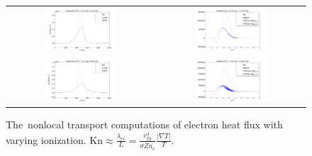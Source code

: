 \documentclass[preprint,12pt]{elsarticle}
\newcommand{\mfpei}{\lambda_{ei}}
\newcommand{\Zbar}{\bar{Z}}
\newcommand{\vth}{v_{th}}
\newcounter{bla}
\begin{document}
\begin{figure}[tbh]
\begin{center}
\begin{tabular}{cc}
      \includegraphics[width=0.5\textwidth]{../results/fe_analysis/figs/P5_heatfluxes_niZ2_Kn13e-3.png} &
      \includegraphics[width=0.5\textwidth]{../results/fe_analysis/figs/P5_kinetics_niZ2_Kn13e-3.png} \\
      \includegraphics[width=0.5\textwidth]{../results/fe_analysis/figs/P5_heatfluxes_niZ1_Kn5e-2.png} &
      \includegraphics[width=0.5\textwidth]{../results/fe_analysis/figs/P5_kinetics_niZ1_Kn5e-2.png} 
    \end{tabular}
  \caption{
  The~nonlocal transport computations of electron heat flux with 
  varying ionization. 
  Kn$\approx \frac{\mfpei}{L} = \frac{\vth^4}{\sigma \Zbar n_e} 
  \frac{|\nabla T|}{T}.$
  }
  \end{center}
  \label{fig:AWBSvsSH_f1}
\end{figure}
\end{document}
